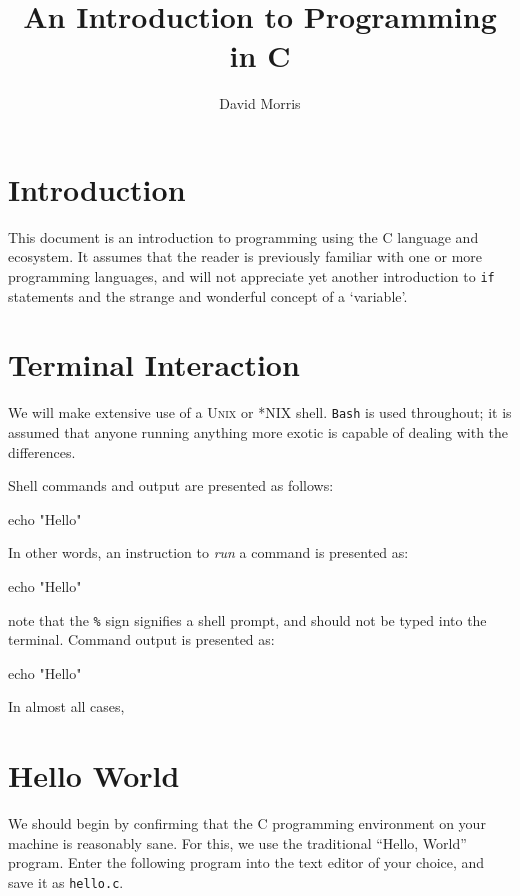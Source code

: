\documentclass[a4paper,10pt]{article}
\title{An Introduction to Programming in C}
\author{David Morris}
\newcommand{\drmcode}[3]{\begin{minipage}{\columnwidth}\end{minipage}}
\newcommand{\ccode}[2]{\drmcode{C}{#1}{#2.c}}
\newcommand{\cfile}[1]{\texttt{#1}}
\begin{document}
\maketitle

\tableofcontents

\lstlistoflistings

\section{Introduction}

This document is an introduction to programming using the C language
and ecosystem. It assumes that the reader is previously familiar with
one or more programming languages, and will not appreciate yet another
introduction to \texttt{if} statements and the strange and wonderful
concept of a `variable'.

\section{Terminal Interaction}

We will make extensive use of a \textsc{Unix} or *NIX
shell. \texttt{Bash} is used throughout; it is assumed that anyone
running anything more exotic is capable of dealing with the
differences.

Shell commands and output are presented as follows:

echo "Hello"
\END

\noindent
In other words, an instruction to \emph{run} a command is presented
as:

\bash[script]
echo "Hello"
\END

\noindent
note that the \texttt{\%} sign signifies a shell prompt, and should
not be typed into the terminal. Command output is presented as:

\bash[stdout]
echo "Hello"
\END

\noindent
In almost all cases, 

\section{Hello World}

We should begin by confirming that the C programming environment on
your machine is reasonably sane. For this, we use the traditional
``Hello, World'' program. Enter the following program into the text
editor of your choice, and save it as \cfile{hello.c}.

\ccode{\cfile{hello.c}}{hello}
\end{document}
